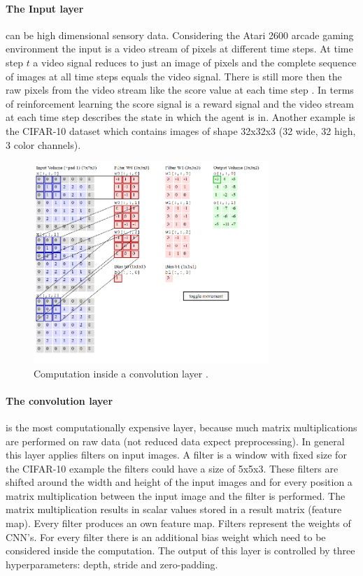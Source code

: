 \documentclass[conference]{IEEEtran}
\begin{document}
\paragraph{The Input layer} can be high dimensional sensory data. Considering the Atari 2600 arcade gaming environment \cite{DBLP:journals/corr/MnihBMGLHSK16, DBLP:journals/corr/HasseltGS15, DRL:HumanLevelControl} the input is a video stream of pixels at different time steps. At time step $t$ a video signal reduces to just an image of pixels and the complete sequence of images at all time steps equals the video signal. There is still more then the raw pixels from the video stream like the score value at each time step \cite{DRL:HumanLevelControl}. In terms of reinforcement learning the score signal is a reward signal and the video stream at each time step describes the state in which the agent is in. Another example is the CIFAR-10 dataset which contains images of shape 32x32x3 (32 wide, 32 high, 3 color channels).

\begin{figure}[!t]
\centering
\includegraphics[width=3.5in]{convolutional_layer}
\caption{Computation inside a convolution layer \cite{KarpathyCNN}.}
\label{fig:convolutional_layer}
\end{figure}

\paragraph{The convolution layer} is the most computationally expensive layer, because much matrix multiplications are performed on raw data (not reduced data expect preprocessing). In general this layer applies filters on input images. A filter is a window with fixed size for the CIFAR-10 example the filters could have a size of 5x5x3. These filters are shifted around the width and height of the input images and for every position a matrix multiplication between the input image and the filter is performed. The matrix multiplication results in scalar values stored in a result matrix (feature map). Every filter produces an own feature map. Filters represent the weights of CNN's. For every filter there is an additional bias weight which need to be considered inside the computation. The output of this layer is controlled by three hyperparameters: depth, stride and zero-padding.
\end{document}
